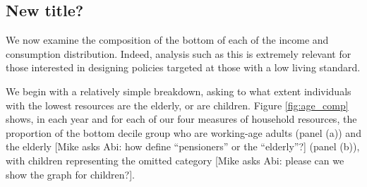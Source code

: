 \subsection{New title?}

We now examine the composition of the bottom of each of the income and consumption distribution. Indeed, analysis such as this is extremely relevant for those interested in designing policies targeted at those with a low living standard.

We begin with a relatively simple breakdown, asking to what extent individuals with the lowest resources are the elderly, or are children. Figure \ref{fig:age_comp} shows, in each year and for each of our four measures of household resources, the proportion of the bottom decile group who are working-age adults (panel (a)) and the elderly [Mike asks Abi: how define ``pensioners'' or the ``elderly''?] (panel (b)), with children representing the omitted category [Mike asks Abi: please can we show the graph for children?].

